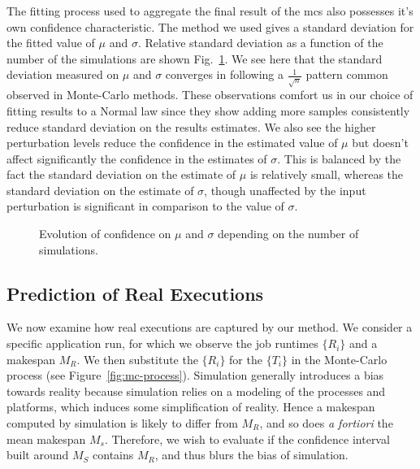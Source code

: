 \documentclass[10pt,conference,compsocconf]{IEEEtran}
\begin{document}
The fitting process used to aggregate the final result of the \ac{mcs} also 
possesses it's own confidence characteristic. The method we used
gives a standard deviation for the fitted value of $\mu$ and $\sigma$. Relative
standard deviation as a function of the number of the simulations are shown
Fig.~\ref{fig:confidence}. We see here that the standard deviation measured on
$\mu$ and $\sigma$ converges in following a $\frac{1}{\sqrt{n}}$ pattern
common observed in Monte-Carlo methods. These observations comfort us in our
choice of fitting results to a Normal law since they show adding more samples
consistently reduce standard deviation on the results estimates. We also see the
higher perturbation levels reduce the confidence in the estimated value of $\mu$
but doesn't affect significantly the confidence in the estimates of $\sigma$.
This is balanced by the fact the standard deviation on the estimate of $\mu$
is relatively small, whereas the standard deviation on the estimate of
$\sigma$, though unaffected by the input perturbation is significant in comparison
to the value of $\sigma$.

\begin{figure}
	\centering
	\resizebox{0.5\textwidth}{!}{%
		
	}
	\resizebox{0.5\textwidth}{!}{%
		
	}
	\caption{Evolution of confidence on $\mu$ and $\sigma$ depending on the
	number of simulations.}
	\label{fig:confidence}
\end{figure}


\subsection{Prediction of Real Executions}
\label{sec:rl}
  
We now  examine how real  executions are captured by  our method. We  consider a
specific application run, for which we  observe the job runtimes $\{R_i\}$ and a
makespan  $M_R$.  We  then substitute  the $\{R_i\}$  for the  $\{T_i\}$ in  the
Monte-Carlo  process  (see Figure~\ref{fig:mc-process}).   Simulation  generally
introduces a bias towards reality because simulation relies on a modeling of the
processes and platforms, which induces  some simplification of reality.  Hence a
makespan computed  by simulation  is likely  to differ from  $M_R$, and  so does
\textit{a fortiori} the mean makespan $M_s$.   Therefore, we wish to evaluate if
the confidence  interval built around $M_S$  contains $M_R$, and thus  blurs the
bias of simulation.



%




\newpage
\end{document}
